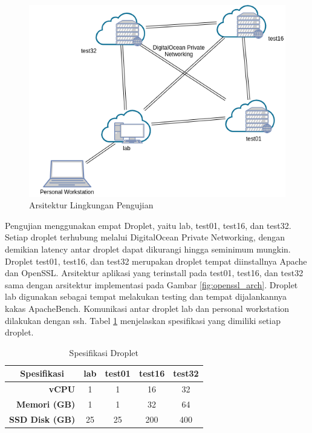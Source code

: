 \begin{figure}[h]
  \centering
  \includegraphics[width=15cm]{resources/img/ch-4/testing_arch.png}
  \caption{Arsitektur Lingkungan Pengujian}
  \label{fig:testing_arch}
\end{figure}

Pengujian menggunakan empat Droplet, yaitu lab, test01, test16, dan test32. Setiap droplet terhubung melalui DigitalOcean Private Networking, dengan demikian latency antar droplet dapat dikurangi hingga seminimum mungkin. Droplet test01, test16, dan test32 merupakan droplet tempat diinstallnya Apache dan OpenSSL. Arsitektur aplikasi yang terinstall pada test01, test16, dan test32 sama dengan arsitektur implementasi pada Gambar \ref{fig:openssl_arch}. Droplet lab digunakan sebagai tempat melakukan testing dan tempat dijalankannya kakas ApacheBench. Komunikasi antar droplet lab dan personal workstation dilakukan dengan ssh. Tabel \ref{tab:droplet_specs} menjelaskan spesifikasi yang dimiliki setiap droplet.

\begin{table}[]
  \caption{Spesifikasi Droplet} %
  \label{tab:droplet_specs}
  \centering %
  \begin{tabular}{@{}rcccc@{}}
    \toprule
    \multicolumn{1}{c}{\textbf{Spesifikasi}} & \textbf{lab} & \textbf{test01} & \textbf{test16} & \textbf{test32} \\ \midrule
    \textbf{vCPU}                            & 1            & 1               & 16              & 32              \\
    \textbf{Memori (GB)}                     & 1            & 1               & 32              & 64              \\
    \textbf{SSD Disk (GB)}                   & 25           & 25              & 200             & 400             \\ \bottomrule
  \end{tabular}
\end{table}

